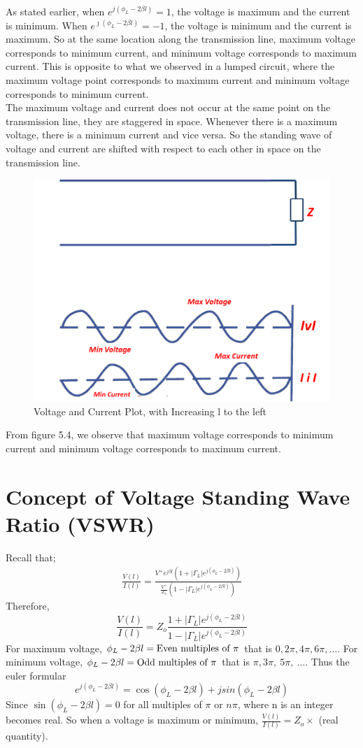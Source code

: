 As stated earlier, when $ e^{j(\phi_L - 2 \beta l)} = 1$, the voltage is maximum and the current is minimum. When $ e^{\jmath(\phi_L - 2 \beta l)} = -1$, the voltage is minimum and the current is maximum. So at the same location along the transmission line, maximum voltage corresponds to minimum current, and minimum voltage corresponds to maximum current. This is opposite to what we observed in a lumped circuit, where the maximum voltage point corresponds to maximum current and minimum voltage corresponds to minimum current.\\
The maximum voltage and current does not occur at the same point on the transmission line, they are staggered in space. Whenever there is a maximum voltage, there is a minimum current and vice versa. So the standing wave of voltage and current are shifted with respect to each other in space on the transmission line. 
\begin{figure}[h]
\centering
\includegraphics[width=0.7\linewidth]{./graphics/fig5.4modified}
\caption{Voltage and Current Plot, with Increasing l to the left}
\label{fig:asdfghjhgfdsa}
\end{figure}
From figure 5.4, we observe that maximum voltage corresponds to minimum current and minimum voltage corresponds to maximum current.

\section{Concept of Voltage Standing Wave Ratio (VSWR)}
Recall that;
\begin{align*}
\frac{V(l)}{I(l)} = \frac{V^{+}e^{j\beta l}(1+ |\Gamma_L|e^{j(\phi_L- 2 \beta l)})}{\frac{V^{+}}{Z_o}(1- |\Gamma_L|e^{j(\phi_L- 2\beta l)})}
\end{align*}
Therefore,
\begin{equation*}
\frac{V(l)}{I(l)} = Z_o \frac{1+ |\Gamma_L|e^{j(\phi_L- 2 \beta l)}}{1- |\Gamma_L|e^{j(\phi_L- 2\beta l)}}
\end{equation*}
For maximum voltage, $\phi_L-2\beta l = \textnormal{Even multiples of }\pi$ that is $0, 2\pi, 4\pi,  6\pi,\ldots$. For minimum voltage,  $\phi_L-2\beta l=\textnormal{Odd multiples of } \pi$ that is $\pi, 3\pi,\ 5\pi,\ \ldots$. Thus the euler formular 
\[e^{j(\phi_L - 2 \beta l)} = \cos(\phi_L - 2 \beta l) + jsin(\phi_L - 2 \beta l)\]
Since $\sin(\phi_L - 2 \beta l) = 0$ for all multiples of $\pi$ or $n\pi$, where n is an integer becomes real. So when a voltage is maximum or minimum, $\frac{V(l)}{I(l)} = Z_o \times$ (real quantity).

